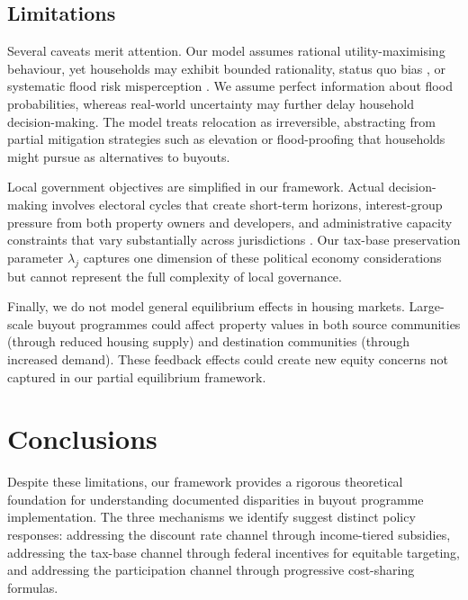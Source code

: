 \documentclass[preprint,12pt,authoryear]{elsarticle}
\begin{document}
\subsection{Limitations}

Several caveats merit attention. Our model assumes rational utility-maximising behaviour, yet households may exhibit bounded rationality, status quo bias \citep{samuelson1988status}, or systematic flood risk misperception \citep{meyer2017ostrich}. We assume perfect information about flood probabilities, whereas real-world uncertainty may further delay household decision-making. The model treats relocation as irreversible, abstracting from partial mitigation strategies such as elevation or flood-proofing that households might pursue as alternatives to buyouts.

Local government objectives are simplified in our framework. Actual decision-making involves electoral cycles that create short-term horizons, interest-group pressure from both property owners and developers, and administrative capacity constraints that vary substantially across jurisdictions \citep{greer2017historical}. Our tax-base preservation parameter $\lambda_j$ captures one dimension of these political economy considerations but cannot represent the full complexity of local governance.

Finally, we do not model general equilibrium effects in housing markets. Large-scale buyout programmes could affect property values in both source communities (through reduced housing supply) and destination communities (through increased demand). These feedback effects could create new equity concerns not captured in our partial equilibrium framework.


\section{Conclusions}\label{sec:conclusions}

Despite these limitations, our framework provides a rigorous theoretical foundation for understanding documented disparities in buyout programme implementation. The three mechanisms we identify suggest distinct policy responses: addressing the discount rate channel through income-tiered subsidies, addressing the tax-base channel through federal incentives for equitable targeting, and addressing the participation channel through progressive cost-sharing formulas.
\end{document}
